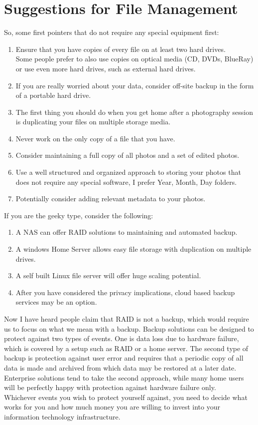 \section{Suggestions for File Management}

So, some first pointers that do not require any special equipment first:

\begin{enumerate}
	\item Ensure that you have copies of every file on at least two hard drives. 
	\\ Some people prefer to also use copies on optical media (CD, DVDs, BlueRay) or use even more hard drives, such as external hard drives.
	\item If you are really worried about your data, consider off-site backup in the form of a portable hard drive.
	\item The first thing you should do when you get home after a photography session is duplicating your files on multiple storage media.
	\item Never work on the only copy of a file that you have.
	\item Consider maintaining a full copy of all photos and a set of edited photos.
	\item Use a well structured and organized approach to storing your photos that does not require any special software, I prefer Year, Month, Day folders.
	\item Potentially consider adding relevant metadata to your photos.
\end{enumerate}

If you are the geeky type, consider the following:

\begin{enumerate}
	\item A NAS can offer RAID solutions to maintaining and automated backup.
	\item A windows Home Server allows easy file storage with duplication on multiple drives.
	\item A self built Linux file server will offer huge scaling potential.
	\item After you have considered the privacy implications, cloud based backup services may be an option.
\end{enumerate}

Now I have heard people claim that RAID is not a backup, which would require us to focus on what we mean with a backup. 
Backup solutions can be designed to protect against two types of events. One is data loss due to hardware failure, which is covered by a setup such as RAID or a home server. The second type of backup is protection against user error and requires that a periodic copy of all data is made and archived from which data may be restored at a later date. Enterprise solutions tend to take the second approach, while many home users will be perfectly happy with protection against hardware failure only.
\\[\baselineskip]
Whichever events you wish to protect yourself against, you need to decide what works for you and how much money you are willing to invest into your information technology infrastructure.



